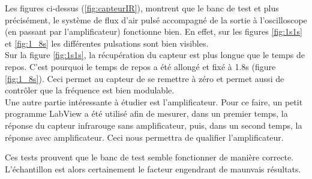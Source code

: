 Les figures ci-dessus (\ref{fig:capteurIR}), montrent que le banc de test et plus précisément, le système de flux d'air pulsé accompagné de
la sortie à l'oscilloscope (en passant par l'amplificateur) fonctionne bien. En effet, sur les figures \ref*{fig:1s1s} et \ref*{fig:1_8s}
les différentes pulsations sont bien visibles.\\

Sur la figure \ref*{fig:1s1s}, la récupération du capteur est plus longue que le temps de repos. C'est pourquoi le temps de repos a été allongé
et fixé à 1.8s (figure \ref*{fig:1_8s}). Ceci permet au capteur de se remettre à zéro et permet aussi de contrôler que la fréquence est bien
modulable. \\

Une autre partie intéressante à étudier est l'amplificateur. Pour ce faire, un petit programme LabView a été utilisé afin de mesurer, dans un
premier temps, la réponse du capteur \gls{infrarouge} sans amplificateur, puis, dans un second temps, la réponse avec amplificateur. Ceci nous
permettra de qualifier l'amplificateur.

Ces tests prouvent que le banc de test semble fonctionner de manière correcte. L'échantillon est alors certainement le facteur engendrant de
maunvais résultats.
